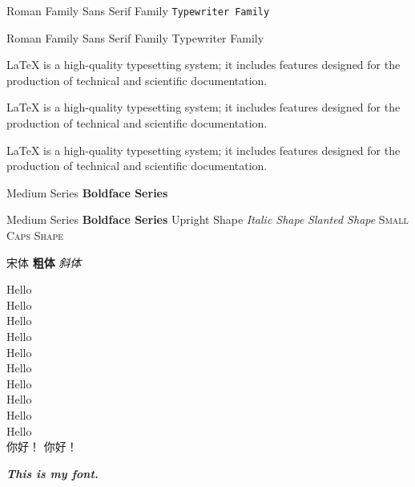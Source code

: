\documentclass{article}
\newcommand{\myfont}{\textit{\textbf{\textsf{This is my font.}}}}
\begin{document}
	\textrm{Roman Family} \textsf{Sans Serif Family} \texttt{Typewriter Family}

	{\rmfamily Roman Family} {\sffamily Sans Serif Family} {\ttfamily Typewriter Family} %
	
	\rmfamily LaTeX is a high-quality typesetting system; it includes features designed for the production of technical and scientific documentation.
	
	LaTeX is a high-quality typesetting system; it includes features designed for the production of technical and scientific documentation.
	
	\ttfamily LaTeX is a high-quality typesetting system; it includes features designed for the production of technical and scientific documentation.
	
	\textmd{Medium Series} \textbf{Boldface Series}
	
	{\mdseries Medium Series} {\bfseries Boldface Series}
	{\upshape Upright Shape} {\itshape Italic Shape} {\slshape Slanted Shape} {\scshape Small Caps Shape}
	
	{\songti 宋体}    \textbf{粗体} \textit{斜体}  %
	
	{\tiny Hello} \\
	{\scriptsize Hello} \\
	{\footnotesize Hello} \\
	{\small Hello} \\
	{\normalsize Hello} \\
	{\large Hello} \\
	{\Large Hello} \\
	{\LARGE Hello} \\
	{\huge Hello} \\
	{\Huge Hello} \\

	 你好！%
	 你好！%
	
	\myfont 
	
\end{document}
